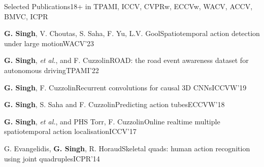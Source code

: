\documentclass{resume} %
\begin{document}
\vspace{0.1in}
\begin{rSection}{Selected Publications}{18+\footnotesize{ in TPAMI, ICCV, CVPRw, ECCVw, WACV, ACCV, BMVC, ICPR}}
  \begin{pSubsection}{\textbf{G. Singh}, V. Choutas, S. Saha, F. Yu, L.V. Gool}{Spatiotemporal action detection under large motion}{WACV}{'23}\end{pSubsection}
  \begin{pSubsection}{\textbf{G. Singh}, \textit{et al.}, and
    F. Cuzzolin}{ROAD: the road event awareness dataset for autonomous driving}{TPAMI}{'22}\end{pSubsection}
  \begin{pSubsection}{\textbf{G. Singh}, F. Cuzzolin}{Recurrent convolutions for causal 3D CNNs}{ICCVW}{'19}\end{pSubsection}
  \begin{pSubsection}{\textbf{G. Singh}, S. Saha and F. Cuzzolin}{Predicting action tubes}{ECCVW}{'18}\end{pSubsection}
  \begin{pSubsection}{\textbf{G. Singh}, \textit{et al.}, and PHS Torr, F. Cuzzolin}{Online realtime multiple spatiotemporal action localisation}{ICCV}{'17}\end{pSubsection}
  \begin{pSubsection}{G. Evangelidis, \textbf{G. Singh}, R. Horaud}{Skeletal quads: human action recognition using joint quadruples}{ICPR}{'14}\end{pSubsection}
  
  \end{rSection}
\end{document}
